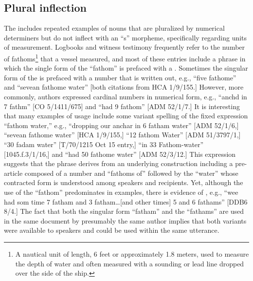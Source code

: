 \subsection{{Plural inflection}}%

The  includes repeated examples of nouns that are pluralized by numerical determiners but do not inflect with an “s” morpheme, specifically regarding units of measurement. Logbooks and witness testimony frequently refer to the number of fathoms\footnote{A nautical unit of length, 6 feet or approximately 1.8 meters, used to measure the depth of water and often measured with a sounding or lead line dropped over the side of the ship.} that a vessel measured, and most of these entries include a phrase in which the single form of the  “fathom” is prefaced with a . Sometimes the singular form of the  is prefaced with a number that is written out, e.g., “five fathome” and “sevean fathome water” [both citations from HCA 1/9/155.] However, more commonly, authors expressed cardinal numbers in numerical form, e.g., “anchd in 7 fathm” [CO 5/1411/675] and “had 9 fathom” [ADM 52/1/7.] It is interesting that many examples of usage include some variant spelling of the fixed expression “fathom water,” e.g., “dropping our anchar in 6 fatham water” [ADM 52/1/6,] “sevean fathome water” [HCA 1/9/155,] “12 fathom Water” [ADM 51/3797/1,] “30 fadam water” [T/70/1215 Oct 15 entry,] “in 33 Fathom-water” [1045.f.3/1/16,] and “had 50 fathome water” [ADM 52/3/12.] This expression suggests that the phrase derives from an underlying construction including a pre-article composed of a number and “fathoms of” followed by the  “water” whose contracted form is understood among speakers and recipients. Yet, although the use of the   “fathom” predominates in  examples, there is evidence of , e.g., “wee had som time 7 fatham and 3 fatham…[and other times] 5 and 6 fathams” [DDB6 8/4.] The fact that both the singular form “fatham” and the  “fathams” are used in the same document by presumably the same author implies that both variants were available to speakers and could be used within the same utterance. 

